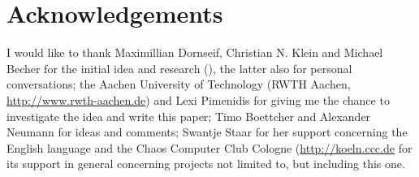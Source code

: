 %
%

\section{Acknowledgements}

I would like to thank Maximillian Dornseif, Christian N. Klein and Michael
Becher for the initial idea and research (\cite{cansecwest_firewire:2005}), the
latter also for personal conversations; the Aachen University of Technology
(RWTH Aachen, \href{http://www.rwth-aachen.de}{http://www.rwth-aachen.de}) and
Lexi Pimenidis for giving me the chance to investigate the idea and write this
paper; Timo Boettcher and Alexander Neumann for ideas and comments; Swantje
Staar for her support concerning the English language and the Chaos Computer
Club Cologne (\href{http://koeln.ccc.de}{http://koeln.ccc.de} for its support in
general concerning projects not limited to, but including this one.


